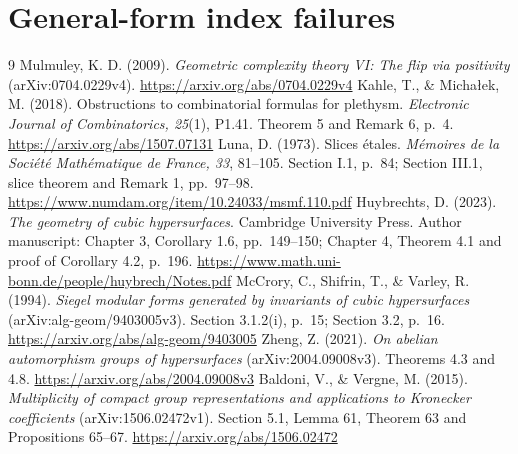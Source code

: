 \documentclass[11pt,a4paper]{article}
\begin{document}

\section{General-form index failures}








\begin{thebibliography}{9}
 Mulmuley, K. D. (2009).
\emph{Geometric complexity theory VI: The flip via positivity}
(arXiv:0704.0229v4). \url{https://arxiv.org/abs/0704.0229v4}
Kahle, T., \& Micha\l ek, M. (2018).
Obstructions to combinatorial formulas for plethysm.
\emph{Electronic Journal of Combinatorics, 25}(1), P1.41.
Theorem 5 and Remark 6, p.~4.
\url{https://arxiv.org/abs/1507.07131}
 Luna, D. (1973).
Slices \'etales. \emph{M\'emoires de la Soci\'et\'e Math\'ematique
de France, 33}, 81--105. Section I.1, p.~84; Section III.1,
slice theorem and Remark 1, pp.~97--98.
\url{https://www.numdam.org/item/10.24033/msmf.110.pdf}
 Huybrechts, D. (2023).
\emph{The geometry of cubic hypersurfaces}. Cambridge University Press.
Author manuscript: Chapter 3, Corollary 1.6, pp.~149--150;
Chapter 4, Theorem 4.1 and proof of Corollary 4.2, p.~196.
\url{https://www.math.uni-bonn.de/people/huybrech/Notes.pdf}
 McCrory, C., Shifrin, T.,
\& Varley, R. (1994). \emph{Siegel modular forms generated by
invariants of cubic hypersurfaces} (arXiv:alg-geom/9403005v3).
Section 3.1.2(i), p.~15; Section 3.2, p.~16.
\url{https://arxiv.org/abs/alg-geom/9403005}
 Zheng, Z. (2021).
\emph{On abelian automorphism groups of hypersurfaces}
(arXiv:2004.09008v3). Theorems 4.3 and 4.8.
\url{https://arxiv.org/abs/2004.09008v3}
Baldoni, V., \& Vergne, M. (2015).
\emph{Multiplicity of compact group representations and applications
to Kronecker coefficients} (arXiv:1506.02472v1).
Section 5.1, Lemma 61, Theorem 63 and Propositions 65--67.
\url{https://arxiv.org/abs/1506.02472}
\end{thebibliography}
\end{document}
